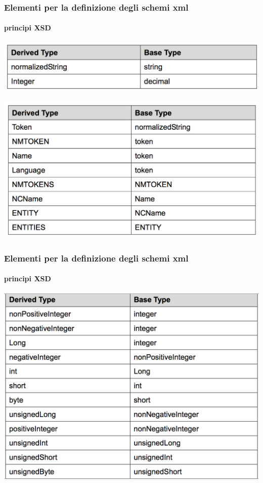 \begin{frame}
	\frametitle{Elementi per la definizione degli schemi xml}
	\framesubtitle{principi XSD}
	\addtocounter{nframe}{1}

	\begin{center}
		\includegraphics[width=.95\textwidth]{imgs/DerivedTypeBaseType(2types).png}
	\end{center}

	\begin{center}
		\includegraphics[width=.95\textwidth]{imgs/DerivedTypeFromDerivedType(8types).png}
	\end{center}

\end{frame}

\begin{frame}
	\frametitle{Elementi per la definizione degli schemi xml}
	\framesubtitle{principi XSD}
	\addtocounter{nframe}{1}

	\begin{center}
		\includegraphics[width=.95\textwidth]{imgs/NumericalDerivedType(12types).png}
	\end{center}

\end{frame}



